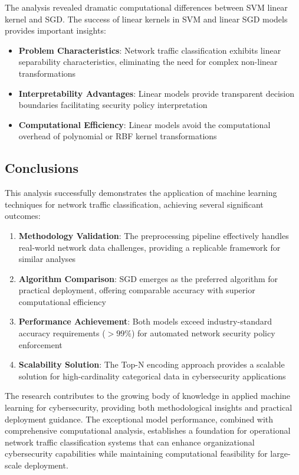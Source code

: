 \documentclass[12pt,a4paper]{article}
\begin{document}
The analysis revealed dramatic computational differences between SVM linear kernel and SGD.
The success of linear kernels in SVM and linear SGD models provides important insights:

\begin{itemize}
    \item \textbf{Problem Characteristics}: Network traffic classification exhibits linear separability characteristics, eliminating the need for complex non-linear transformations
    \item \textbf{Interpretability Advantages}: Linear models provide transparent decision boundaries facilitating security policy interpretation
    \item \textbf{Computational Efficiency}: Linear models avoid the computational overhead of polynomial or RBF kernel transformations
\end{itemize}

\subsection{Conclusions}

This analysis successfully demonstrates the application of machine learning techniques for network traffic classification, achieving several significant outcomes:

\begin{enumerate}
    \item \textbf{Methodology Validation}: The preprocessing pipeline effectively handles real-world network data challenges, providing a replicable framework for similar analyses
    \item \textbf{Algorithm Comparison}: SGD emerges as the preferred algorithm for practical deployment, offering comparable accuracy with superior computational efficiency
    \item \textbf{Performance Achievement}: Both models exceed industry-standard accuracy requirements ($>99\%$) for automated network security policy enforcement
    \item \textbf{Scalability Solution}: The Top-N encoding approach provides a scalable solution for high-cardinality categorical data in cybersecurity applications
\end{enumerate}

The research contributes to the growing body of knowledge in applied machine learning for cybersecurity, providing both methodological insights and practical deployment guidance. The exceptional model performance, combined with comprehensive computational analysis, establishes a foundation for operational network traffic classification systems that can enhance organizational cybersecurity capabilities while maintaining computational feasibility for large-scale deployment.
\end{document}

